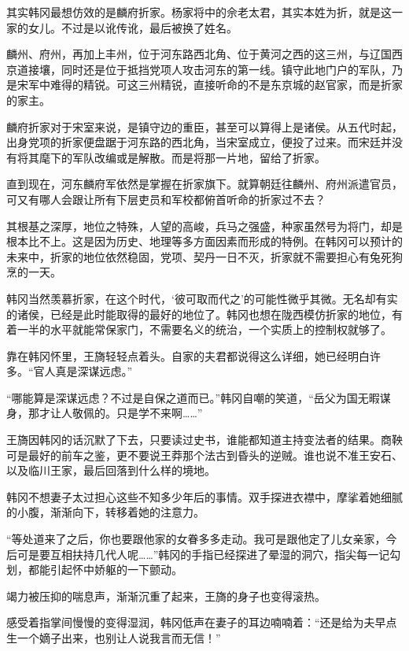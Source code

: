其实韩冈最想仿效的是麟府折家。杨家将中的佘老太君，其实本姓为折，就是这一家的女儿。不过是以讹传讹，最后被换了姓名。

麟州、府州，再加上丰州，位于河东路西北角、位于黄河之西的这三州，与辽国西京道接壤，同时还是位于抵挡党项人攻击河东的第一线。镇守此地门户的军队，乃是宋军中难得的精锐。可这三州精锐，直接听命的不是东京城的赵官家，而是折家的家主。

麟府折家对于宋室来说，是镇守边的重臣，甚至可以算得上是诸侯。从五代时起，出身党项的折家便盘踞于河东路的西北角，当宋室成立，便投了过来。而宋廷并没有将其麾下的军队改编或是解散。而是将那一片地，留给了折家。

直到现在，河东麟府军依然是掌握在折家旗下。就算朝廷往麟州、府州派遣官员，可又有哪人会跟让所有下层吏员和军校都俯首听命的折家过不去？

其根基之深厚，地位之特殊，人望的高峻，兵马之强盛，种家虽然号为将门，却是根本比不上。这是因为历史、地理等多方面因素而形成的特例。在韩冈可以预计的未来中，折家的地位依然稳固，党项、契丹一日不灭，折家就不需要担心有兔死狗烹的一天。

韩冈当然羡慕折家，在这个时代，‘彼可取而代之’的可能性微乎其微。无名却有实的诸侯，已经是此时能取得的最好的地位了。韩冈也想在陇西模仿折家的地位，有着一半的水平就能常保家门，不需要名义的统治，一个实质上的控制权就够了。

靠在韩冈怀里，王旖轻轻点着头。自家的夫君都说得这么详细，她已经明白许多。“官人真是深谋远虑。”

“哪能算是深谋远虑？不过是自保之道而已。”韩冈自嘲的笑道，“岳父为国无暇谋身，那才让人敬佩的。只是学不来啊……”

王旖因韩冈的话沉默了下去，只要读过史书，谁能都知道主持变法者的结果。商鞅可是最好的前车之鉴，更不要说王莽那个法古到昏头的逆贼。谁也说不准王安石、以及临川王家，最后回落到什么样的境地。

韩冈不想妻子太过担心这些不知多少年后的事情。双手探进衣襟中，摩挲着她细腻的小腹，渐渐向下，转移着她的注意力。

“等处道来了之后，你也要跟他家的女眷多多走动。我可是跟他定了儿女亲家，今后可是要互相扶持几代人呢……”韩冈的手指已经探进了晕湿的洞穴，指尖每一记勾划，都能引起怀中娇躯的一下颤动。

竭力被压抑的喘息声，渐渐沉重了起来，王旖的身子也变得滚热。

感受着指掌间慢慢的变得湿润，韩冈低声在妻子的耳边喃喃着：“还是给为夫早点生一个嫡子出来，也别让人说我言而无信！”

